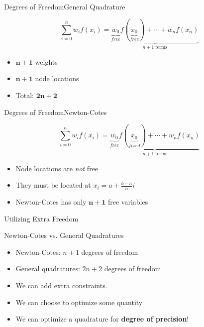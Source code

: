 \documentclass[10pt]{beamer}
\begin{document}
\begin{frame}{Degrees of Freedom}{General Quadrature}

{
}


    $$\sum_{i=0}^n w_i f(x_i) = \underbrace{ \underbrace{w_0}_{free} f(\underbrace{x_0}_{free})  + \cdots + w_n f(x_n)}_{n+1 \;\text{terms}}$$
\begin{itemize} 
    \item $\mathbf{n+1}$ weights 
    \item $\mathbf{n+1}$ node locations
    \item Total: $\mathbf{2n + 2}$
\end{itemize}
\end{frame}
\begin{frame}{Degrees of Freedom}{Newton-Cotes}


    $$\sum_{i=0}^n w_i f(x_i) = \underbrace{ \underbrace{w_0}_{free} f(\underbrace{x_0}_{fixed})  + \cdots + w_n f(x_n)}_{n+1 \;\text{terms}}$$
\begin{itemize}
    \item Node locations are \textit{not} free
    \item They must be located at $x_i = a+\frac{b-a}{n}i$
    \item Newton-Cotes has only $\mathbf{n+1}$ free variables

\end{itemize}
\end{frame}
\begin{frame}{Utilizing Extra Freedom}

\begin{block}{Newton-Cotes vs. General Quadratures}
\begin{itemize}
    \item Newton-Cotes: $n+1$ degrees of freedom 
    \item General quadratures: $2n+2$ degrees of freedom
\end{itemize}
\end{block}



\begin{itemize}
  \item We can add extra constraints. 
  \item We can choose to optimize some quantity 
  \item We can optimize a quadrature for \textbf{degree of precision}!
\end{itemize}
\end{frame}
\end{document}
